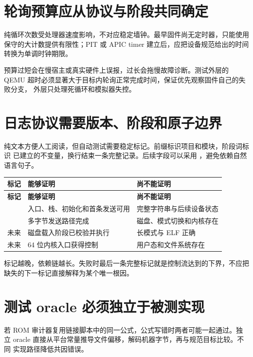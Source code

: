 \section{轮询预算应从协议与阶段共同确定}

纯循环次数受处理器速度影响，不对应稳定墙钟。最早固件尚无定时器，只能使用
保守的大计数提供有限性；PIT 或 APIC timer 建立后，应把设备规范给出的时间
转换为单调时钟期限。

预算过短会在慢宿主或真实硬件上误报，过长会拖慢故障诊断。测试外层的 QEMU
超时必须显著大于目标内轮询正常完成时间，保证优先观察固件自己的失败分支，
外层只处理死循环和模拟器失控。

\section{日志协议需要版本、阶段和原子边界}

纯文本方便人工阅读，但自动测试需要稳定标记。前缀标识项目和模块，阶段词标识
已建立的不变量，换行结束一条完整记录。后续字段可以采用
，避免依赖自然语言句子。

\begin{longtable}{L{0.28\textwidth}L{0.31\textwidth}L{0.28\textwidth}}
\toprule
\textbf{标记} & \textbf{能够证明} & \textbf{尚不能证明}\\
\midrule
\endfirsthead
\toprule
\textbf{标记} & \textbf{能够证明} & \textbf{尚不能证明}\\
\midrule
\endhead
{} & 入口、栈、初始化和首条发送可用 & 完整字符串与后续设备状态\\
 & 多字节发送路径完成 & 磁盘、模式切换和内核存在\\
未来  & 磁盘载入阶段已校验并执行 & 长模式与 ELF 正确\\
未来  & 64 位内核入口获得控制 & 用户态和文件系统存在\\
\bottomrule
\end{longtable}

标记越晚，依赖链越长。失败时最后一条完整标记就是控制流达到的下界，不应把
缺失的下一标记直接解释为某个唯一根因。

\section{测试 oracle 必须独立于被测实现}

若 ROM 审计器复用链接脚本中的同一公式，公式写错时两者可能一起通过。独立
oracle 直接从平台常量推导文件偏移，解码机器字节，再与规范目标比较。不同
实现路径降低共因错误。

